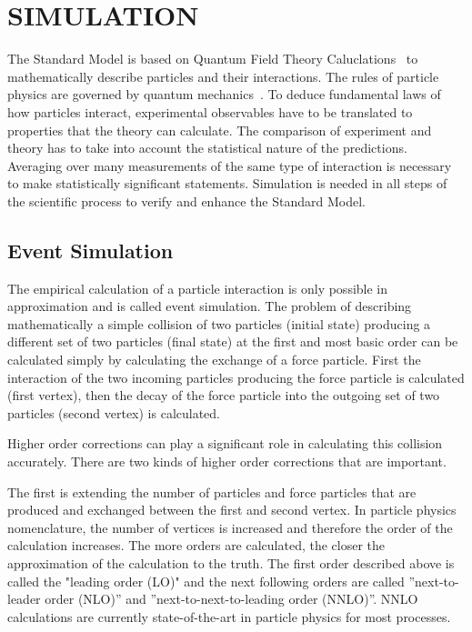 \documentclass{wscpaperproc}
\theoremstyle{wsc}
\begin{document}
\section{SIMULATION}
\label{sec:simulation}

The Standard Model is based on Quantum Field Theory Caluclations~ to mathematically describe particles and their interactions. The rules of particle physics are governed by quantum mechanics~. To deduce fundamental laws of how particles interact, experimental observables have to be translated to properties that the theory can calculate. The comparison of experiment and theory has to take into account the statistical nature of the predictions. Averaging over many measurements of the same type of interaction is necessary to make statistically significant statements. Simulation is needed in all steps of the scientific process to verify and enhance the Standard Model.

\subsection{Event Simulation} 
\label{subsec:eventsimulation}

The empirical calculation of a particle interaction is only possible in approximation and is called event simulation. The problem of describing mathematically a simple collision of two particles (initial state) producing a different set of two particles (final state) at the first and most basic order can be calculated simply by calculating the exchange of a force particle. First the interaction of the two incoming particles producing the force particle is calculated (first vertex), then the decay of the force particle into the outgoing set of two particles (second vertex) is calculated.

Higher order corrections can play a significant role in calculating this collision accurately. There are two kinds of higher order corrections that are important. 

The first is extending the number of particles and force particles that are produced and exchanged between the first and second vertex. In particle physics nomenclature, the number of vertices is increased and therefore the order of the calculation increases. The more orders are calculated, the closer the approximation of the calculation to the truth. The first order described above is called the "leading order (LO)" and the next following orders are called ''next-to-leader order (NLO)'' and ''next-to-next-to-leading order (NNLO)''. NNLO calculations are currently state-of-the-art in particle physics for most processes.
\end{document}
